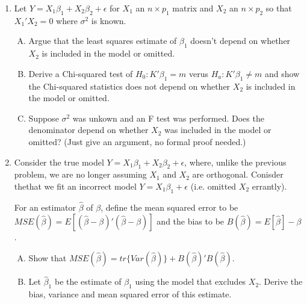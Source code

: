 \documentclass[12pt]{article}
\begin{document}
\begin{enumerate}[1.]

\item Let $Y = X_1 \beta_1 + X_2 \beta_2 + \epsilon$ for $X_1$ an $n \times p_1$ matrix and $X_2$ an $n\times p_2$
so that $X_1'X_2 = 0$ where $\sigma^2$ is known. 
\begin{enumerate}[A.]
\item Argue that the least squares estimate of $\beta_1$ doesn't depend on whether $X_2$ is included in the model or omitted.
\item Derive a Chi-squared test of $H_0: K'\beta_1 = m$ verus $H_a : K' \beta_1 \neq m$ and show the Chi-squared statistics does not depend on whether $X_2$ is included in the model or omitted.
\item Suppose $\sigma^2$ was unkown and an F test was performed. Does the denominator depend on whether $X_2$ was included in the model or omitted? (Just give an argument, no formal proof needed.)
\end{enumerate}

\newpage

\item Consider the true model $Y = X_1 \beta_1 + X_2 \beta_2 + \epsilon$, where, unlike the previous problem, we are no longer
assuming $X_1$ and $X_2$ are orthogonal. Conisder thethat we fit an incorrect
model  $Y = X_1 \beta_1 + \epsilon$ (i.e. omitted $X_2$ errantly). 

For an estimator $\hat \beta$ of $\beta$, define the mean squared error to be $MSE(\hat \beta) = E[(\hat \beta - \beta)' (\hat \beta - \beta)]$ and the bias to be  $B(\hat \beta) = E[\hat \beta] - \beta$. 
\begin{enumerate}[A.]
\item Show that $MSE(\hat \beta) = tr\{Var(\hat \beta)\} + B(\hat \beta)'B(\hat \beta)$.
\item Let $\hat \beta_1$ be the estimate of $\beta_1$ using the model that excludes $X_2$. Derive the bias, variance and
mean squared error of this estimate.
\end{enumerate}

%


\end{enumerate}
\end{document}
